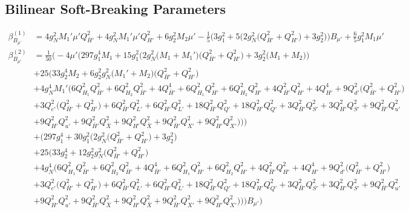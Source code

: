 \subsection{Bilinear Soft-Breaking Parameters}
{\allowdisplaybreaks  \begin{align} 
\beta_{B_{\mu'}}^{(1)} & =  
4 g_{N}^{2} M_1' \mu' Q_{\bar{H}'}^{2}  + 4 g_{N}^{2} M_1' \mu' Q_{H'}^{2}  + 6 g_{2}^{2} M_2 \mu'  -\frac{1}{5} \Big(3 g_{1}^{2}  + 5 \Big(2 g_{N}^{2} \Big(Q_{\bar{H}'}^{2} + Q_{H'}^{2}\Big) + 3 g_{2}^{2} \Big)\Big)B_{\mu'}  + \frac{6}{5} g_{1}^{2} M_1 \mu' \\ 
\beta_{B_{\mu'}}^{(2)} & =  
\frac{1}{50} \Big(-4 \mu' \Big(297 g_{1}^{4} M_1 +15 g_{1}^{2} \Big(2 g_{N}^{2} \Big(M_1 + M_1'\Big)\Big(Q_{\bar{H}'}^{2} + Q_{H'}^{2}\Big) + 3 g_{2}^{2} \Big(M_1 + M_2\Big)\Big)\nonumber \\ 
 &+25 \Big(33 g_{2}^{4} M_2 +6 g_{2}^{2} g_{N}^{2} \Big(M_1' + M_2\Big)\Big(Q_{\bar{H}'}^{2} + Q_{H'}^{2}\Big)\nonumber \\ 
 &+4 g_{N}^{4} M_1' \Big(6 Q_{H_1}^{2} Q_{\bar{H}'}^{2} +6 Q_{H_2}^{2} Q_{\bar{H}'}^{2} +4 Q_{\bar{H}'}^{4} +6 Q_{H_1}^{2} Q_{H'}^{2} +6 Q_{H_2}^{2} Q_{H'}^{2} +4 Q_{\bar{H}'}^{2} Q_{H'}^{2} +4 Q_{H'}^{4} +9 Q_{d'}^{2} \Big(Q_{\bar{H}'}^{2} + Q_{H'}^{2}\Big)\nonumber \\ 
 &+3 Q_{e'}^{2} \Big(Q_{\bar{H}'}^{2} + Q_{H'}^{2}\Big)+6 Q_{\bar{H}'}^{2} Q_{L'}^{2} +6 Q_{H'}^{2} Q_{L'}^{2} +18 Q_{\bar{H}'}^{2} Q_{Q'}^{2} +18 Q_{H'}^{2} Q_{Q'}^{2} +3 Q_{\bar{H}'}^{2} Q_{S'}^{2} +3 Q_{H'}^{2} Q_{S'}^{2} +9 Q_{\bar{H}'}^{2} Q_{u'}^{2} \nonumber \\ 
 &+9 Q_{H'}^{2} Q_{u'}^{2} +9 Q_{\bar{H}'}^{2} Q_{\bar{X}}^{2} +9 Q_{H'}^{2} Q_{\bar{X}}^{2} +9 Q_{\bar{H}'}^{2} Q_{X'}^{2} +9 Q_{H'}^{2} Q_{X'}^{2} \Big)\Big)\Big)\nonumber \\ 
 &+\Big(297 g_{1}^{4} +30 g_{1}^{2} \Big(2 g_{N}^{2} \Big(Q_{\bar{H}'}^{2} + Q_{H'}^{2}\Big) + 3 g_{2}^{2} \Big)\nonumber \\ 
 &+25 \Big(33 g_{2}^{4} +12 g_{2}^{2} g_{N}^{2} \Big(Q_{\bar{H}'}^{2} + Q_{H'}^{2}\Big)\nonumber \\ 
 &+4 g_{N}^{4} \Big(6 Q_{H_1}^{2} Q_{\bar{H}'}^{2} +6 Q_{H_2}^{2} Q_{\bar{H}'}^{2} +4 Q_{\bar{H}'}^{4} +6 Q_{H_1}^{2} Q_{H'}^{2} +6 Q_{H_2}^{2} Q_{H'}^{2} +4 Q_{\bar{H}'}^{2} Q_{H'}^{2} +4 Q_{H'}^{4} +9 Q_{d'}^{2} \Big(Q_{\bar{H}'}^{2} + Q_{H'}^{2}\Big)\nonumber \\ 
 &+3 Q_{e'}^{2} \Big(Q_{\bar{H}'}^{2} + Q_{H'}^{2}\Big)+6 Q_{\bar{H}'}^{2} Q_{L'}^{2} +6 Q_{H'}^{2} Q_{L'}^{2} +18 Q_{\bar{H}'}^{2} Q_{Q'}^{2} +18 Q_{H'}^{2} Q_{Q'}^{2} +3 Q_{\bar{H}'}^{2} Q_{S'}^{2} +3 Q_{H'}^{2} Q_{S'}^{2} +9 Q_{\bar{H}'}^{2} Q_{u'}^{2} \nonumber \\ 
 &+9 Q_{H'}^{2} Q_{u'}^{2} +9 Q_{\bar{H}'}^{2} Q_{\bar{X}}^{2} +9 Q_{H'}^{2} Q_{\bar{X}}^{2} +9 Q_{\bar{H}'}^{2} Q_{X'}^{2} +9 Q_{H'}^{2} Q_{X'}^{2} \Big)\Big)\Big)B_{\mu'} \Big)
\end{align}} 
